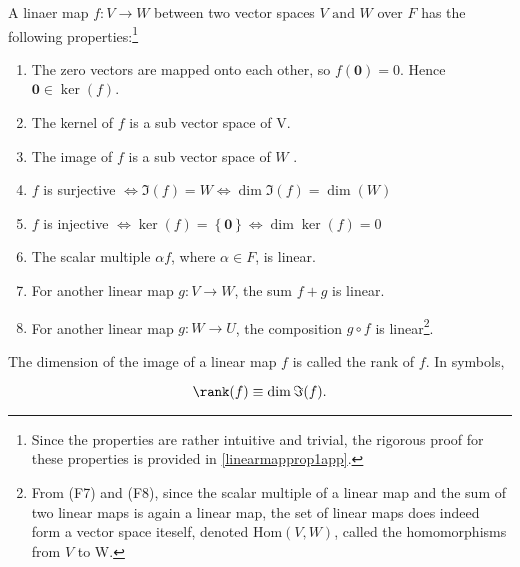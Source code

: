 \documentclass[a4paper,12pt]{report}
\begin{document}
\begin{lemma} \label{linearmapprop1} 
A linaer map \(f:V \rightarrow W\) between two vector spaces \(V \text { and }  W\) over \(F\) has the following properties:\footnote{Since the properties are rather intuitive and trivial, the rigorous proof for these properties is provided in \cref{linearmapprop1app}.} 

\begin{enumerate}[label=(F\arabic*)]
    \item The zero vectors are mapped onto each other, so \(f(\boldsymbol{0} ) = 0\). Hence \(\boldsymbol{0} \in \ker (f) \).
    \item The kernel of \(f\) is a sub vector space of V.
    \item The image of \(f\) is a sub vector space of \(W\) .
    \item \(f\) is surjective \(\iff \Im (f) = W \iff \dim \Im (f) = \dim (W)\)
    \item \(f\) is injective \(\iff \ker (f) = \left\{ \boldsymbol{0}  \right\} \iff \dim \ker (f) = 0\)
    \item The scalar multiple \(\alpha f\), where \(\alpha \in  F\), is linear.
    \item For another linear map \(g: V \rightarrow W\), the sum \(f+g\) is linear.
    \item For another linear map \(g: W \rightarrow  U\), the composition \(g \circ f\) is linear\footnote{From (F7) and (F8), since the scalar multiple of a linear map and the sum of two linear maps is again a linear map, the set of linear maps does indeed form a vector space iteself, denoted \(\text{Hom}(V,W)\), called the homomorphisms from \(V\) to W.}.  
\end{enumerate}
\end{lemma}

\begin{definition} 
The dimension of the image of a linear map \(f\) is called the rank of \(f\). In symbols,

\begin{equation}
    \rank (f) \equiv \dim \Im (f).
\end{equation}
    
\end{definition}
\end{document}
